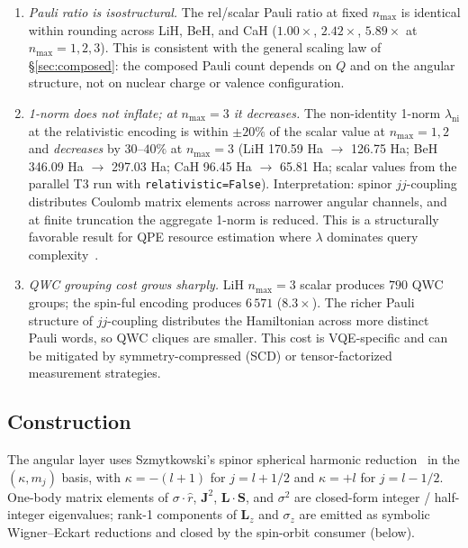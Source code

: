 \begin{enumerate}
  \item \emph{Pauli ratio is isostructural.} The rel/scalar Pauli
    ratio at fixed $n_{\max}$ is identical within rounding across
    LiH, BeH, and CaH ($1.00\times$, $2.42\times$, $5.89\times$ at
    $n_{\max}=1,2,3$). This is consistent with the general scaling
    law of \S\ref{sec:composed}: the composed Pauli count depends
    on $Q$ and on the angular structure, not on nuclear charge or
    valence configuration.

  \item \emph{1-norm does not inflate; at $n_{\max}=3$ it decreases.}
    The non-identity 1-norm $\lambda_{\mathrm{ni}}$ at the
    relativistic encoding is within $\pm 20\%$ of the scalar value
    at $n_{\max}=1,2$ and \emph{decreases} by $30$--$40\%$ at
    $n_{\max}=3$ (LiH 170.59 Ha $\to$ 126.75 Ha;
    BeH 346.09 Ha $\to$ 297.03 Ha;
    CaH 96.45 Ha $\to$ 65.81 Ha; scalar values from the
    parallel T3 run with \texttt{relativistic=False}). Interpretation:
    spinor $jj$-coupling distributes Coulomb matrix elements across
    narrower angular channels, and at finite truncation the aggregate
    1-norm is reduced. This is a structurally favorable result for
    QPE resource estimation where $\lambda$ dominates query
    complexity~\cite{ChildsBerry}.

  \item \emph{QWC grouping cost grows sharply.} LiH $n_{\max}=3$
    scalar produces $790$ QWC groups; the spin-ful encoding produces
    $6\,571$ ($8.3\times$). The richer Pauli structure of $jj$-coupling
    distributes the Hamiltonian across more distinct Pauli words, so
    QWC cliques are smaller. This cost is VQE-specific and can be
    mitigated by symmetry-compressed (SCD) or tensor-factorized
    measurement strategies.
\end{enumerate}

\subsection{Construction}
\label{subsec:spinor_construction}

The angular layer uses Szmytkowski's spinor spherical harmonic
reduction~\cite{Szmytkowski2007} in the $(\kappa, m_j)$ basis,
with $\kappa = -(l+1)$ for $j = l + 1/2$ and $\kappa = +l$ for
$j = l - 1/2$. One-body matrix elements of $\sigma \cdot \hat{r}$,
$\mathbf{J}^2$, $\mathbf{L}\cdot\mathbf{S}$, and $\sigma^2$ are
closed-form integer / half-integer eigenvalues; rank-1 components of
$\mathbf{L}_z$ and $\sigma_z$ are emitted as symbolic Wigner--Eckart
reductions and closed by the spin-orbit consumer (below).

